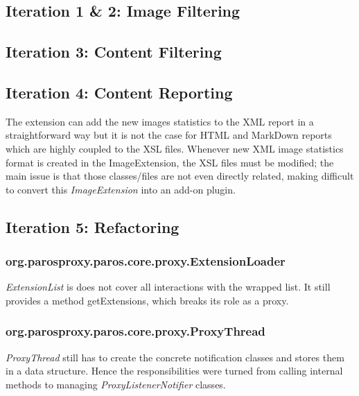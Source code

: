 \subsection{Iteration 1 \& 2: Image Filtering}
\subsection{Iteration 3: Content Filtering}
\subsection{Iteration 4: Content Reporting}
The extension can add the new images statistics to the XML report in a straightforward way but it is not the case for HTML and MarkDown reports which are highly coupled to the XSL files. Whenever new XML image statistics format is created in the ImageExtension, the XSL files must be modified; the main issue is that those classes/files are not even directly related, making difficult to convert this \textit{ImageExtension} into an add-on plugin.

\subsection{Iteration 5: Refactoring}
\subsubsection{org.parosproxy.paros.core.proxy.ExtensionLoader}
\textit{ExtensionList} is does not cover all interactions with the wrapped list. It still provides a method getExtensions, which breaks its role as a proxy.
\subsubsection{org.parosproxy.paros.core.proxy.ProxyThread}

\textit{ProxyThread} still has to create the concrete notification classes and stores them in a data structure. Hence the responsibilities were turned from calling internal methods to managing \textit{ProxyListenerNotifier} classes.
